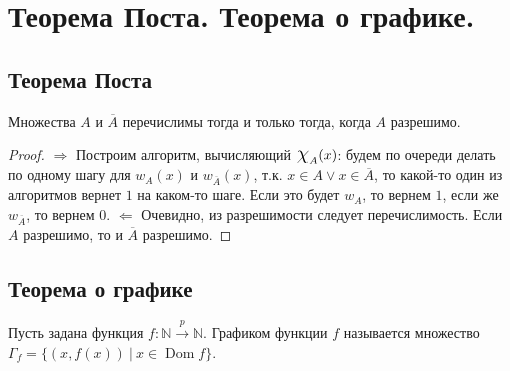 \section{Теорема Поста. Теорема о графике.}

\subsection{Теорема Поста}

\begin{theorem}
  Множества $A$ и $\overline{A}$ перечислимы тогда и только тогда, когда $A$ разрешимо.
  \begin{proof}
    $\Rightarrow$ \newline
    Построим алгоритм, вычисляющий $\mbox{\Large$\chi$}_A(x)$: будем по очереди делать по одному шагу для $w_A(x)$ и $w_{\overline{A}}(x)$, т.к. $x \in A \vee x \in \overline{A}$, то какой-то один из алгоритмов вернет $1$ на каком-то шаге. Если это будет $w_A$, то вернем $1$, если же $w_{\overline{A}}$, то вернем $0$. \newline
    $\Leftarrow$ \newline
    Очевидно, из разрешимости следует перечислимость. Если $A$ разрешимо, то и $\overline{A}$ разрешимо.
  \end{proof}
\end{theorem}

\subsection{Теорема о графике}

\begin{definition}
  Пусть задана функция $f : \mathbb{N} \overset{p}{\to} \mathbb{N}$. Графиком функции $f$ называется множество $\Gamma_f = \{(x, f(x)) \> | \> x \in \operatorname{Dom} f\}$.
\end{definition}

